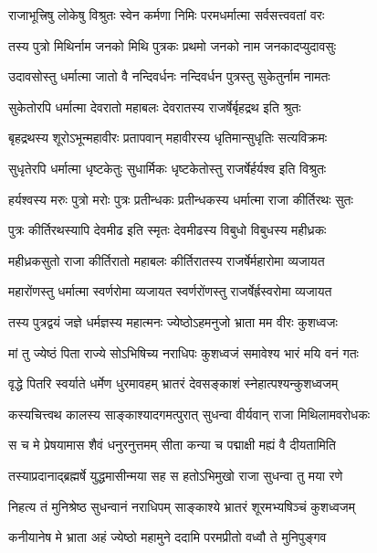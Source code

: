 \twolineshloka
{राजाभूत्त्रिषु लोकेषु विश्रुतः स्वेन कर्मणा}
{निमिः परमधर्मात्मा सर्वसत्त्ववतां वरः} %

\twolineshloka
{तस्य पुत्रो मिथिर्नाम जनको मिथि पुत्रकः}
{प्रथमो जनको नाम जनकादप्युदावसुः} %

\twolineshloka
{उदावसोस्तु धर्मात्मा जातो वै नन्दिवर्धनः}
{नन्दिवर्धन पुत्रस्तु सुकेतुर्नाम नामतः} %

\twolineshloka
{सुकेतोरपि धर्मात्मा देवरातो महाबलः}
{देवरातस्य राजर्षेर्बृहद्रथ इति श्रुतः} %

\twolineshloka
{बृहद्रथस्य शूरोऽभून्महावीरः प्रतापवान्}
{महावीरस्य धृतिमान्सुधृतिः सत्यविक्रमः} %

\twolineshloka
{सुधृतेरपि धर्मात्मा धृष्टकेतुः सुधार्मिकः}
{धृष्टकेतोस्तु राजर्षेर्हर्यश्व इति विश्रुतः} %

\twolineshloka
{हर्यश्वस्य मरुः पुत्रो मरोः पुत्रः प्रतीन्धकः}
{प्रतीन्धकस्य धर्मात्मा राजा कीर्तिरथः सुतः} %

\twolineshloka
{पुत्रः कीर्तिरथस्यापि देवमीढ इति स्मृतः}
{देवमीढस्य विबुधो विबुधस्य महीध्रकः} %

\twolineshloka
{महीध्रकसुतो राजा कीर्तिरातो महाबलः}
{कीर्तिरातस्य राजर्षेर्महारोमा व्यजायत} %

\twolineshloka
{महारोंणस्तु धर्मात्मा स्वर्णरोमा व्यजायत}
{स्वर्णरोंणस्तु राजर्षेर्ह्रस्वरोमा व्यजायत} %

\twolineshloka
{तस्य पुत्रद्वयं जज्ञे धर्मज्ञस्य महात्मनः}
{ज्येष्ठोऽहमनुजो भ्राता मम वीरः कुशध्वजः} %

\twolineshloka
{मां तु ज्येष्ठं पिता राज्ये सोऽभिषिच्य नराधिपः}
{कुशध्वजं समावेश्य भारं मयि वनं गतः} %

\twolineshloka
{वृद्धे पितरि स्वर्याते धर्मेण धुरमावहम्}
{भ्रातरं देवसङ्काशं स्नेहात्पश्यन्कुशध्वजम्} %

\twolineshloka
{कस्यचित्त्वथ कालस्य साङ्काश्यादगमत्पुरात्}
{सुधन्वा वीर्यवान् राजा मिथिलामवरोधकः} %

\twolineshloka
{स च मे प्रेषयामास शैवं धनुरनुत्तमम्}
{सीता कन्या च पद्माक्षी मह्यं वै दीयतामिति} %

\twolineshloka
{तस्याप्रदानाद्ब्रह्मर्षे युद्धमासीन्मया सह}
{स हतोऽभिमुखो राजा सुधन्वा तु मया रणे} %

\twolineshloka
{निहत्य तं मुनिश्रेष्ठ सुधन्वानं नराधिपम्}
{साङ्काश्ये भ्रातरं शूरमभ्यषिञ्चं कुशध्वजम्} %

\twolineshloka
{कनीयानेष मे भ्राता अहं ज्येष्ठो महामुने}
{ददामि परमप्रीतो वध्वौ ते मुनिपुङ्गव} %

